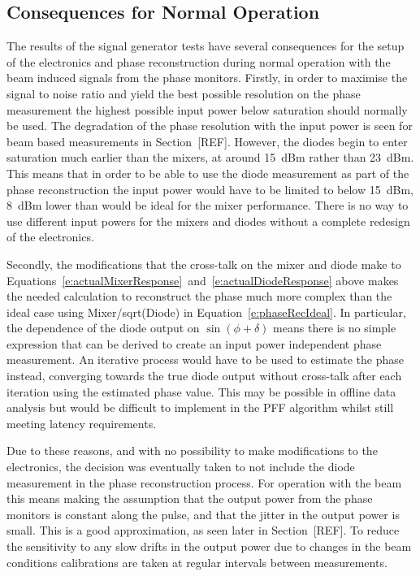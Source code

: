\subsection{Consequences for Normal Operation}
\label{ss:sigGenConsq}

The results of the signal generator tests have several consequences for the setup of the electronics and phase reconstruction during normal operation with the beam induced signals from the phase monitors. Firstly, in order to maximise the signal to noise ratio and yield the best possible resolution on the phase measurement the highest possible input power below saturation should normally be used. The degradation of the phase resolution with the input power is seen for beam based measurements in Section~[REF]. However, the diodes begin to enter saturation much earlier than the mixers, at around 15~dBm rather than 23~dBm. This means that in order to be able to use the diode measurement as part of the phase reconstruction the input power would have to be limited to below 15~dBm, 8~dBm lower than would be ideal for the mixer performance. There is no way to use different input powers for the mixers and diodes without a complete redesign of the electronics.

Secondly, the modifications that the cross-talk on the mixer and diode make to Equations~\ref{e:actualMixerResponse}~and~\ref{e:actualDiodeResponse} above makes the needed calculation to reconstruct the phase much more complex than the ideal case using Mixer/sqrt(Diode) in Equation~\ref{e:phaseRecIdeal}. In particular, the dependence of the diode output on \(\sin(\phi+\delta)\) means there is no simple expression that can be derived to create an input power independent phase measurement. An iterative process would have to be used to estimate the phase instead, converging towards the true diode output without cross-talk after each iteration using the estimated phase value. This may be possible in offline data analysis but would be difficult to implement in the PFF algorithm whilst still meeting latency requirements.

Due to these reasons, and with no possibility to make modifications to the electronics, the decision was eventually taken to not include the diode measurement in the phase reconstruction process. For operation with the beam this means making the assumption that the output power from the phase monitors is constant along the pulse, and that the jitter in the output power is small. This is a good approximation, as seen later in Section~[REF]. To reduce the sensitivity to any slow drifts in the output power due to changes in the beam conditions calibrations are taken at regular intervals between measurements.

